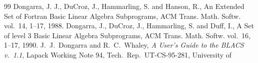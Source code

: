 \begin{thebibliography}{99}
 Dongarra, J. J.,  DuCroz, J.,  Hammarling, S. and Hanson, R.,
An Extended Set of {F}ortran {B}asic {L}inear {A}lgebra {S}ubprograms,
{ACM Trans. Math. Softw.} vol.~{14}, 1--17, 1988.
  Dongarra, J., DuCroz, J., Hammarling, S. and Duff, I.,
A  Set of level 3 Basic Linear Algebra Subprograms,
{ACM Trans. Math. Softw.} vol.~{16}, 1--17, 1990.
%
%
%
%
%
%
%
J.~J.~Dongarra and R.~C.~Whaley,
{\em A User's Guide to the BLACS v.~1.1},
Lapack Working Note 94, Tech.\ Rep.\ UT-CS-95-281, University of

\end{thebibliography}
